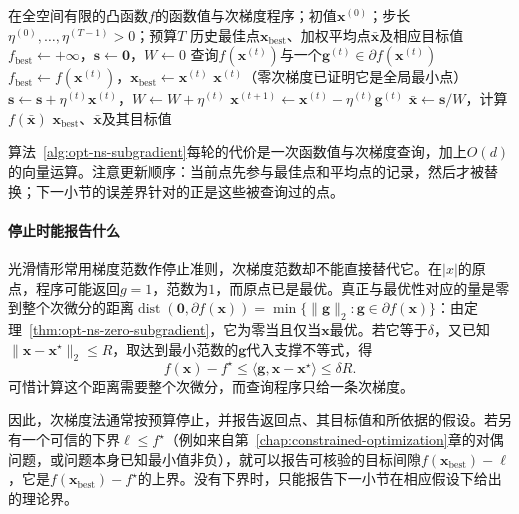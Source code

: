 \begin{algorithm}[次梯度法]
  \label{alg:opt-ns-subgradient}
  \begin{algorithmic}[1]
    \Require 在全空间有限的凸函数$f$的函数值与次梯度程序；初值$\bm x^{(0)}$；步长$\eta^{(0)},\dots,\eta^{(T-1)}>0$；预算$T$
    \Ensure 历史最佳点$\bm x_{\mathrm{best}}$、加权平均点$\bar{\bm x}$及相应目标值
    \State $f_{\mathrm{best}}\gets+\infty$，$\bm s\gets\bm 0$，$W\gets0$
      \State 查询$f(\bm x^{(t)})$与一个$\bm g^{(t)}\in\partial f(\bm x^{(t)})$
        \State $f_{\mathrm{best}}\gets f(\bm x^{(t)})$，$\bm x_{\mathrm{best}}\gets\bm x^{(t)}$
      \EndIf
        \State \Return $\bm x^{(t)}$（零次梯度已证明它是全局最小点）
      \EndIf
      \State $\bm s\gets\bm s+\eta^{(t)}\bm x^{(t)}$，$W\gets W+\eta^{(t)}$
      \State $\bm x^{(t+1)}\gets\bm x^{(t)}-\eta^{(t)}\bm g^{(t)}$
    \EndFor
    \State $\bar{\bm x}\gets\bm s/W$，计算$f(\bar{\bm x})$
    \State \Return $\bm x_{\mathrm{best}}$、$\bar{\bm x}$及其目标值
  \end{algorithmic}
\end{algorithm}

算法~\ref{alg:opt-ns-subgradient}每轮的代价是一次函数值与次梯度查询，加上$O(d)$的向量运算。注意更新顺序：当前点先参与最佳点和平均点的记录，然后才被替换；下一小节的误差界针对的正是这些被查询过的点。

\paragraph{停止时能报告什么}
光滑情形常用梯度范数作停止准则，次梯度范数却不能直接替代它。在$|x|$的原点，程序可能返回$g=1$，范数为$1$，而原点已是最优。真正与最优性对应的量是零到整个次微分的距离$\operatorname{dist}(\bm 0,\partial f(\bm x))=\min\{\lVert\bm g\rVert_2:\bm g\in\partial f(\bm x)\}$：由定理~\ref{thm:opt-ns-zero-subgradient}，它为零当且仅当$\bm x$最优。若它等于$\delta$，又已知$\lVert\bm x-\bm x^\star\rVert_2\leq R$，取达到最小范数的$\bm g$代入支撑不等式，得
\[
 f(\bm x)-f^\star\leq\langle\bm g,\bm x-\bm x^\star\rangle\leq\delta R.
\]
可惜计算这个距离需要整个次微分，而查询程序只给一条次梯度。

因此，次梯度法通常按预算停止，并报告返回点、其目标值和所依据的假设。若另有一个可信的下界$\ell\leq f^\star$（例如来自第~\ref{chap:constrained-optimization}章的对偶问题，或问题本身已知最小值非负），就可以报告可核验的目标间隙$f(\bm x_{\mathrm{best}})-\ell$，它是$f(\bm x_{\mathrm{best}})-f^\star$的上界。没有下界时，只能报告下一小节在相应假设下给出的理论界。

